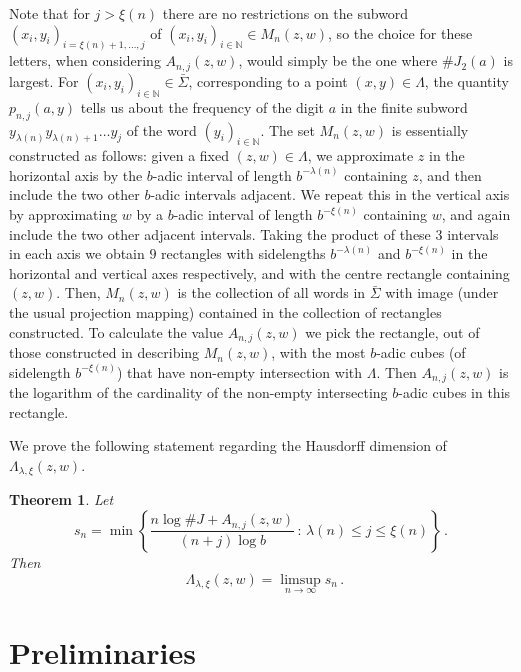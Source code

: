 \documentclass[12pt]{article}
\newtheorem{theorem}[definition]{Theorem}
\theoremstyle{remark}
\numberwithin{equation}{section}
\renewcommand{\Bbb}[1]{\mathbb{#1}}
\newcommand{\N}{{\Bbb N}}         %
\newcommand{\0}{\mathbf{0}}
\DeclareMathOperator{\dimh}{\dim_H}
\begin{document}
Note that for $j>\xi(n)$ there are no restrictions on the subword $(x_{i},y_{i})_{i=\xi(n)+1, \ldots, j}$ of \newline\mbox{$(x_{i},y_{i})_{i\in\N}\in M_{n}(z,w)$}, so the choice for these letters, when considering $A_{n,j}(z,w)$, would simply be the one where $\#J_{2}(a)$ is largest. For $(x_{i},y_{i})_{i \in \N} \in \bar{\Sigma}$, corresponding to a point $(x,y) \in \Lambda$, the quantity $p_{n,j}(a,y)$ tells us about the frequency of the digit $a$ in the finite subword $y_{\lambda(n)}y_{\lambda(n)+1}\dots y_{j}$ of the word $(y_{i})_{i \in \N}$. The set $M_{n}(z,w)$ is essentially constructed as follows: given a fixed $(z,w) \in \Lambda$, we approximate $z$ in the horizontal axis by the $b$-adic interval of length $b^{-\lambda(n)}$ containing $z$, and then include the two other $b$-adic intervals adjacent. We repeat this in the vertical axis by approximating $w$ by a $b$-adic interval of length $b^{-\xi(n)}$ containing $w$, and again include the two other adjacent intervals. Taking the product of these $3$ intervals in each axis we obtain $9$ rectangles with sidelengths $b^{-\lambda(n)}$ and $b^{-\xi(n)}$ in the horizontal and vertical axes respectively, and with the centre rectangle containing $(z,w)$. Then, $M_{n}(z,w)$ is the collection of all words in $\bar{\Sigma}$ with image (under the usual projection mapping) contained in the collection of rectangles constructed. To calculate the value $A_{n,j}(z,w)$ we pick the rectangle, out of those constructed in describing $M_{n}(z,w)$, with the most $b$-adic cubes (of sidelength $b^{-\xi(n)}$) that have non-empty intersection with $\Lambda$. Then $A_{n,j}(z,w)$ is the logarithm of the cardinality of the non-empty intersecting $b$-adic cubes in this rectangle. \par

We prove the following statement regarding the Hausdorff dimension of $\Lambda_{\lambda, \xi}(z,w)$.
 
\begin{theorem} \label{main}
Let 
\begin{equation*}
    s_{n}=\min\left\{ \frac{n\log\#J + A_{n,j}(z,w)}{(n+j)\log b} \, : \, \lambda(n) \leq j \leq \xi(n) \right\}\, . 
\end{equation*}
Then
\begin{equation*}
 \dimh \Lambda_{\lambda,\xi}(z,w) = \limsup_{n \to \infty} s_{n}\, . 
\end{equation*}
\end{theorem}

\section{Preliminaries} \label{prelims}
\end{document}
